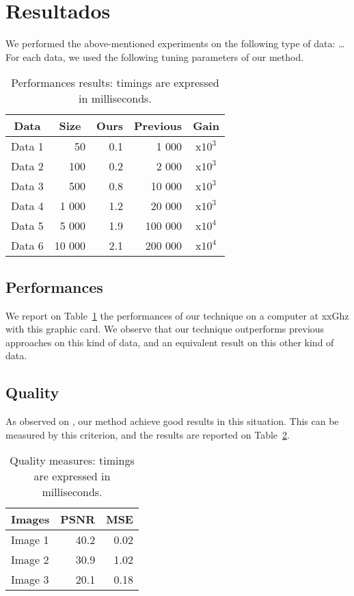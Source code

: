 \section{Resultados}
%
We performed the above-mentioned experiments on the following type of data: \ldots{} For each data, we used the following tuning parameters of our method.


\begin{table}
\caption{Performances results: timings are expressed in milliseconds.}
\label{tab:perfs}
\centering
\begin{tabular}{lr|rr|c}
\multicolumn{1}{c}{\bf Data} &
\multicolumn{1}{c|}{\bf Size} &
\multicolumn{1}{c}{\bf Ours} &
\multicolumn{1}{c|}{\bf Previous} &
\multicolumn{1}{c}{\bf Gain} \\ \hline
Data 1	&        50 	& 0.1 &     1 000	& x$10^3$ \\
Data 2	&      100 	& 0.2 &     2 000	& x$10^3$ \\
Data 3	&      500 	& 0.8 &   10 000	& x$10^3$ \\
Data 4	&   1 000 	& 1.2 &   20 000	& x$10^3$ \\
Data 5	&   5 000 	& 1.9 & 100 000	& x$10^4$ \\
Data 6	& 10 000 	& 2.1 & 200 000	& x$10^4$
\end{tabular}
\end{table}
%
\subsection{Performances}
%
We report on Table~\ref{tab:perfs} the performances of our technique on a computer at xxGhz with this graphic card.
We observe that our technique outperforms previous approaches on this kind of data, and an equivalent result on this other kind of data.



\subsection{Quality}
%
As observed on , our method achieve good results in this situation. 
This can be measured by this criterion, and the results are reported on Table~\ref{tab:quality}.

\begin{table}
\caption{Quality measures: timings are expressed in milliseconds.}
\label{tab:quality}
\centering
\begin{tabular}{l|r|r}
\multicolumn{1}{c}{\bf Images} &
\multicolumn{1}{c|}{\bf PSNR} &
\multicolumn{1}{c}{\bf  MSE} \\ \hline
Image 1	&  40.2	& 0.02 \\
Image 2	&  30.9	& 1.02 \\
Image 3 &  20.1 & 0.18 \\
\end{tabular}
\end{table}


